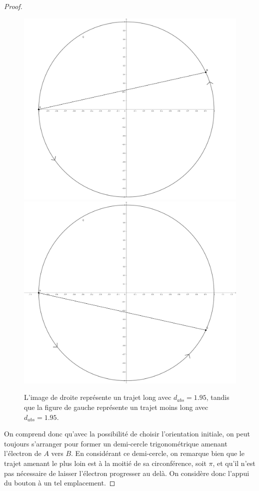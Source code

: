 \documentclass{amsart}
\theoremstyle{definition}
\theoremstyle{remark}
\numberwithin{equation}{section}
\begin{document}
\begin{proof}
  \begin{figure}[H]
    \centering
    \includegraphics[scale=0.079]{images/ab_circle1.png}
    \includegraphics[scale=0.079]{images/ab_circle2.png}
    \caption{L'image de droite représente un trajet long avec $d_{abs}=1.95$, tandis que la figure de gauche représente un trajet moins long avec $d_{abs}=1.95$.}
  \end{figure}

  On comprend donc qu'avec la possibilité de choisir l'orientation initiale, on peut toujours s'arranger pour former un demi-cercle trigonométrique amenant l'électron de $A$ vers $B$. En considérant ce demi-cercle, on remarque bien que le trajet
  amenant le plus loin est à la moitié de sa circonférence, soit $\pi$, et qu'il n'est pas nécessaire de laisser l'électron progresser au delà. On considère donc l'appui du bouton à un tel emplacement.


\end{proof}
\end{document}
